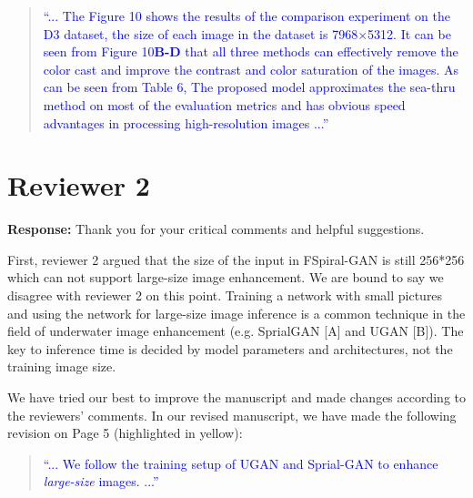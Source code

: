 \documentclass[a4paper,twoside,10pt]{reviewresponse}
\newcommand\tgray[1]{\textcolor{blue}{#1}}
\begin{document}
\begin{quotation}
	\tgray{
		``... The Figure 10 shows the results of the comparison experiment on the D3 dataset, the size of each image in the dataset is 7968$\times$5312. It can be seen from Figure 10\textbf{B-D} that all three methods can effectively remove the color cast and improve the contrast and color saturation of the images. As can be seen from Table 6, The proposed model approximates the sea-thru method on most of the evaluation metrics and has obvious speed advantages in processing high-resolution images ...''
}
\end{quotation}



\section{Reviewer 2}

\textbf{Response:} 
Thank you for your critical comments and helpful suggestions.

First, reviewer 2 argued that the size of the input in FSpiral-GAN is still 256*256 which can not support large-size image enhancement. We are bound to say we disagree with reviewer 2 on this point. Training a network with small pictures and using the network for large-size image inference is a common technique in the field of underwater image enhancement (e.g. SprialGAN [A] and UGAN [B]). The key to inference time is decided by model parameters and architectures, not the training image size.

We have tried our best to improve the manuscript and made changes according to the reviewers' comments. In our revised manuscript, we have made the following revision on Page 5 (highlighted in yellow):

\begin{quotation}
	\tgray{
		``... We follow the training setup of UGAN and Sprial-GAN to enhance \textit{large-size} images. ...''
}
\end{quotation}
\end{document}
